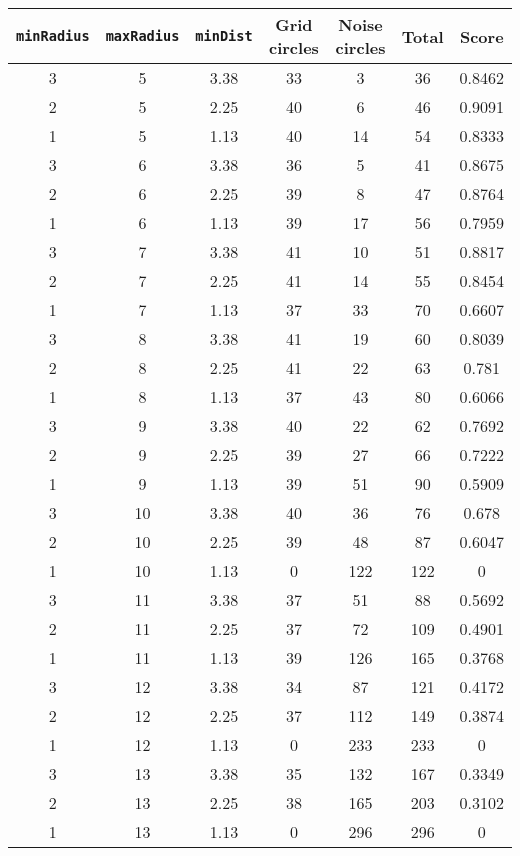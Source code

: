 \documentclass[letterpaper, 12pt]{article}
\begin{document}
\begin{longtable}{|c|c|c|c|c|c|c|}
\hline
\textbf{\texttt{minRadius}} & \textbf{\texttt{maxRadius}} & \textbf{\texttt{minDist}} & \textbf{Grid circles} & \textbf{Noise circles} & \textbf{Total} & \textbf{Score} \\
\hline
3 & 5 & 3.38 & 33 & 3 & 36 & 0.8462 \\
\hline
2 & 5 & 2.25 & 40 & 6 & 46 & 0.9091 \\
\hline
1 & 5 & 1.13 & 40 & 14 & 54 & 0.8333 \\
\hline
3 & 6 & 3.38 & 36 & 5 & 41 & 0.8675 \\
\hline
2 & 6 & 2.25 & 39 & 8 & 47 & 0.8764 \\
\hline
1 & 6 & 1.13 & 39 & 17 & 56 & 0.7959 \\
\hline
3 & 7 & 3.38 & 41 & 10 & 51 & 0.8817 \\
\hline
2 & 7 & 2.25 & 41 & 14 & 55 & 0.8454 \\
\hline
1 & 7 & 1.13 & 37 & 33 & 70 & 0.6607 \\
\hline
3 & 8 & 3.38 & 41 & 19 & 60 & 0.8039 \\
\hline
2 & 8 & 2.25 & 41 & 22 & 63 & 0.781 \\
\hline
1 & 8 & 1.13 & 37 & 43 & 80 & 0.6066 \\
\hline
3 & 9 & 3.38 & 40 & 22 & 62 & 0.7692 \\
\hline
2 & 9 & 2.25 & 39 & 27 & 66 & 0.7222 \\
\hline
1 & 9 & 1.13 & 39 & 51 & 90 & 0.5909 \\
\hline
3 & 10 & 3.38 & 40 & 36 & 76 & 0.678 \\
\hline
2 & 10 & 2.25 & 39 & 48 & 87 & 0.6047 \\
\hline
1 & 10 & 1.13 & 0 & 122 & 122 & 0 \\
\hline
3 & 11 & 3.38 & 37 & 51 & 88 & 0.5692 \\
\hline
2 & 11 & 2.25 & 37 & 72 & 109 & 0.4901 \\
\hline
1 & 11 & 1.13 & 39 & 126 & 165 & 0.3768 \\
\hline
3 & 12 & 3.38 & 34 & 87 & 121 & 0.4172 \\
\hline
2 & 12 & 2.25 & 37 & 112 & 149 & 0.3874 \\
\hline
1 & 12 & 1.13 & 0 & 233 & 233 & 0 \\
\hline
3 & 13 & 3.38 & 35 & 132 & 167 & 0.3349 \\
\hline
2 & 13 & 2.25 & 38 & 165 & 203 & 0.3102 \\
\hline
1 & 13 & 1.13 & 0 & 296 & 296 & 0 \\

\end{longtable}
\end{document}
